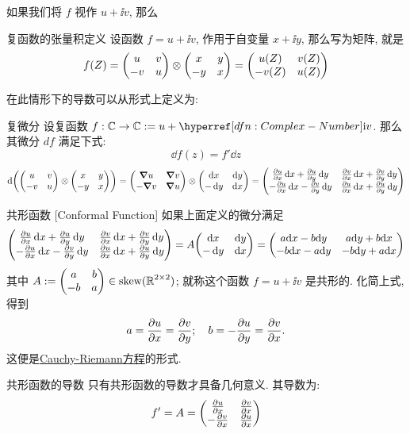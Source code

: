         如果我们将 \(f\) 视作 \(u+\ii v\), 那么

        \begin{xmp}
            {复函数的张量积定义}
            设函数 \(f=u+\ii v\), 作用于自变量 \(x+\ii y\), 那么写为矩阵, 就是
            \[f(Z)=\mqty(u & v \\ -v & u)\otimes\mqty(x & y \\ -y & x)=\mqty(u(Z) & v(Z) \\ -v(Z) & u(Z))\]
        \end{xmp}

        在此情形下的导数可以从形式上定义为: 

        \begin{dfn}
            {复微分}
            设复函数 \(f:\C\to\C:=u+\ii v\). 那么其微分 \(df\) 满足下式: 
            \[\dd{f(z)}=f'\dd{z}\]
            \[\dd\pqty{\mqty(u & v \\ -v & u)\otimes\mqty(x & y\\-y & x)}=\mqty(\grad u & \grad v \\ -\grad v & \grad u)\otimes\mqty(\dd{x} & \dd{y} \\ -\dd{y} & \dd{x})=\mqty(\pdv{u}{x}\dd{x}+\pdv{u}{y}\dd{y} & \pdv{v}{x}\dd{x}+\pdv{v}{y}\dd{y} \\ -\pdv{u}{x}\dd{x}-\pdv{v}{y}\dd{y} & \pdv{u}{x}\dd{x}+\pdv{u}{y}\dd{y})\]
        \end{dfn}

        \begin{dfn}
            {共形函数}
            [Conformal Function]
            如果上面定义的微分满足
            \[\mqty(\pdv{u}{x}\dd{x}+\pdv{u}{y}\dd{y} & \pdv{v}{x}\dd{x}+\pdv{v}{y}\dd{y} \\ -\pdv{u}{x}\dd{x}-\pdv{v}{y}\dd{y} & \pdv{u}{x}\dd{x}+\pdv{u}{y}\dd{y})=A\mqty(\dd{x} & \dd{y} \\ -\dd{y} & \dd{x})=\mqty(a\dd x-b\dd y & a\dd y+b\dd x \\ -b\dd x-a\dd y & -b\dd y+a\dd x)\]
            其中 \(A:=\mqty(a&b\\-b&a)\in\operatorname{skew}(\R^{2\times 2}) \); 就称这个函数 \(f=u+\ii v\) 是共形的. 化简上式, 得到
            \[a=\pdv{u}{x}=\pdv{v}{y};\quad b=-\pdv{u}{y}=\pdv{v}{x}.\]
            这便是\hyperref[thm:Cauchy-Riemann-Equation]{Cauchy-Riemann方程}的形式. 
        \end{dfn}

        \begin{dfn}
            {共形函数的导数}
            只有共形函数的导数才具备几何意义. 其导数为: 
            \[f'=A=\mqty(\pdv{u}{x} & \pdv{v}{x} \\ -\pdv{v}{x} & \pdv{u}{x})\]
        \end{dfn}
    
